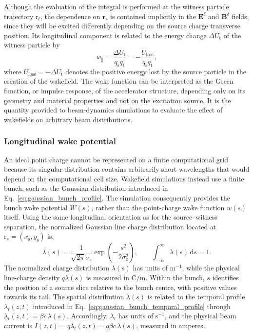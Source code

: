 Although the evaluation of the integral is performed at the witness particle trajectory $\mathrm{r}_t$, the dependence on $\mathbf{r}_{\mathrm{s}}$ is contained implicitly in the $\mathbf{E}^{\delta}$ and $\mathbf{B}^{\delta}$ fields, since they will be excited differently depending on the source charge transverse position. Its longitudinal component is related to the energy change $\Delta U_{\mathrm{t}}$ of the witness particle by
%
\begin{equation}
w_{\parallel} =
\frac{\Delta U_{\mathrm{t}}}
{q_{\mathrm{s}}q_{\mathrm{t}}} = -\frac{U_{\mathrm{loss}}} {q_{\mathrm{s}}q_{\mathrm{t}}},
\label{eq:longitudinal_wake_energy_change}
\end{equation}
%
where $U_{\mathrm{loss}}=-\Delta U_{\mathrm{t}}$ denotes the positive energy lost by the source particle in the creation of the wakefield.
The wake function can be interpreted as the Green function, or impulse response, of the accelerator structure, depending only on its geometry and material properties and not on the excitation source. It is the quantity provided to beam-dynamics simulations to evaluate the effect of wakefields on arbitrary beam distributions.

\subsubsection{Longitudinal wake potential}
\label{sec:wake_field_integration}

An ideal point charge cannot be represented on a finite computational grid because its singular distribution contains arbitrarily short wavelengths that would depend on the computational cell size. Wakefield simulations instead use a finite bunch, such as the Gaussian distribution introduced in Eq.~\eqref{eq:gaussian_bunch_profile}. The simulation consequently provides the bunch wake potential $W(s)$, rather than the point-charge wake function $w(s)$ itself. Using the same longitudinal orientation as for the source--witness separation, the normalized Gaussian line charge distribution located at $\mathrm{r}_s=(x_{\mathrm{s}},y_{\mathrm{s}})$ is,
%
\begin{equation}
\lambda(s)
=
\frac{1}{\sqrt{2\pi}\sigma_z}
\exp\left(-\frac{s^2}{2\sigma_z^2}\right),
\qquad
\int_{-\infty}^{\infty}\lambda(s)\,\mathrm{d}s=1.
\label{eq:gaussian_bunch_profile}
\end{equation}
%
The normalized charge distribution $\lambda(s)$ has units of $\mathrm{m}^{-1}$, while the physical line-charge density $q\lambda(s)$ is measured in $\mathrm{C/m}$. Within the bunch, $s$ identifies the position of a source slice relative to the bunch centre, with positive values towards its tail. The spatial distribution $\lambda(s)$ is related to the temporal profile $\lambda_t(z,t)$ introduced in Eq.~\eqref{eq:gaussian_bunch_temporal_profile} through $\lambda_t(z,t)=\beta c\,\lambda(s)$. Accordingly, $\lambda_t$ has units of $\mathrm{s}^{-1}$, and the physical beam current is $I(z,t)=q\lambda_t(z,t)=q\beta c\,\lambda(s)$, measured in amperes.

